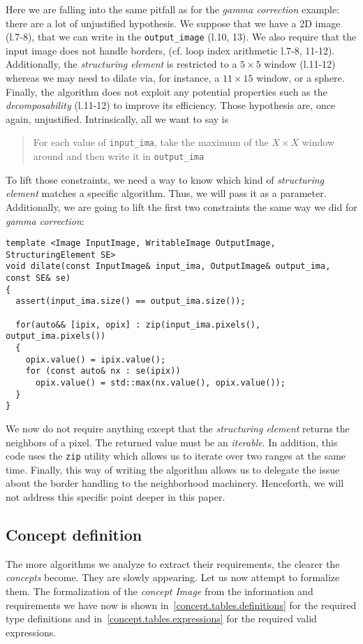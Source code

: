 \noindent Here we are falling into the same pitfall as for the \emph{gamma correction} example: there are a lot of
unjustified hypothesis. We suppose that we have a 2D image (l.7-8), that we can write in the \texttt{output\_image}
(l.10, 13). We also require that the input image does not handle borders, (cf. loop index arithmetic l.7-8, 11-12).
Additionally, the \emph{structuring element} is restricted to a $5 \times 5$ window (l.11-12) whereas we may need to
dilate via, for instance, a $11 \times 15$ window, or a sphere. Finally, the algorithm does not exploit any potential
properties such as the \emph{decomposability} (l.11-12) to improve its efficiency. Those hypothesis are, once again,
unjustified. Intrinsically, all we want to say is \blockquote{For each value of \texttt{input\_ima}, take the maximum
  of the $X \times X$ window around and then write it in \texttt{output\_ima}}.

To lift those constraints, we need a way to know which kind of \emph{structuring element} matches a specific algorithm.
Thus, we will pass it as a parameter. Additionally, we are going to lift the first two constraints the same way we did
for \emph{gamma correction}:

\begin{verbatim}
template <Image InputImage, WritableImage OutputImage, StructuringElement SE>
void dilate(const InputImage& input_ima, OutputImage& output_ima, const SE& se)
{
  assert(input_ima.size() == output_ima.size());

  for(auto&& [ipix, opix] : zip(input_ima.pixels(), output_ima.pixels())
  {
    opix.value() = ipix.value();
    for (const auto& nx : se(ipix))
      opix.value() = std::max(nx.value(), opix.value());
  }
}
\end{verbatim}

\noindent We now do not require anything except that the \emph{structuring element} returns the neighbors of a pixel.
The returned value must be an \emph{iterable}. In addition, this code uses the \texttt{zip} utility which allows us to
iterate over two ranges at the same time. Finally, this way of writing the algorithm allows us to delegate the issue
about the border handling to the neighborhood machinery. Henceforth, we will not address this specific point deeper in
this paper.




\subsection{Concept definition}
The more algorithms we analyze to extract their requirements, the clearer the \emph{concepts} become. They are slowly
appearing. Let us now attempt to formalize them. The formalization of the \emph{concept Image} from the information and
requirements we have now is shown in~\cref{concept.tables.definitions} for the required type definitions and
in~\cref{concept.tables.expressions} for the required valid expressions.

